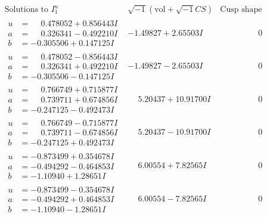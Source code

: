 \documentclass[1p]{elsarticle_modified}
\theoremstyle{definition}
\newcommand{\I}{\sqrt{-1}}
\begin{document}
$$\begin{array}{c|c|c}  
\text{Solutions to }I^u_{1}& \I (\text{vol} + \sqrt{-1}CS) & \text{Cusp shape}\\
 \hline 
\begin{aligned}
u &= \phantom{-}0.478052 + 0.856443 I \\
a &= \phantom{-}0.326341 - 0.492210 I \\
b &= -0.305506 + 0.147125 I\end{aligned}
 & -1.49827 + 2.65503 I & \phantom{-0.000000 } 0 \\ \hline\begin{aligned}
u &= \phantom{-}0.478052 - 0.856443 I \\
a &= \phantom{-}0.326341 + 0.492210 I \\
b &= -0.305506 - 0.147125 I\end{aligned}
 & -1.49827 - 2.65503 I & \phantom{-0.000000 } 0 \\ \hline\begin{aligned}
u &= \phantom{-}0.766749 + 0.715877 I \\
a &= \phantom{-}0.739711 + 0.674856 I \\
b &= -0.247125 - 0.492473 I\end{aligned}
 & \phantom{-}5.20437 + 10.91700 I & \phantom{-0.000000 } 0 \\ \hline\begin{aligned}
u &= \phantom{-}0.766749 - 0.715877 I \\
a &= \phantom{-}0.739711 - 0.674856 I \\
b &= -0.247125 + 0.492473 I\end{aligned}
 & \phantom{-}5.20437 - 10.91700 I & \phantom{-0.000000 } 0 \\ \hline\begin{aligned}
u &= -0.873499 + 0.354678 I \\
a &= -0.494292 - 0.464853 I \\
b &= -1.10940 + 1.28651 I\end{aligned}
 & \phantom{-}6.00554 + 7.82565 I & \phantom{-0.000000 } 0 \\ \hline\begin{aligned}
u &= -0.873499 - 0.354678 I \\
a &= -0.494292 + 0.464853 I \\
b &= -1.10940 - 1.28651 I\end{aligned}
 & \phantom{-}6.00554 - 7.82565 I & \phantom{-0.000000 } 0 \\ \hline\begin{aligned}

\end{aligned}
\end{array}$$
\end{document}
